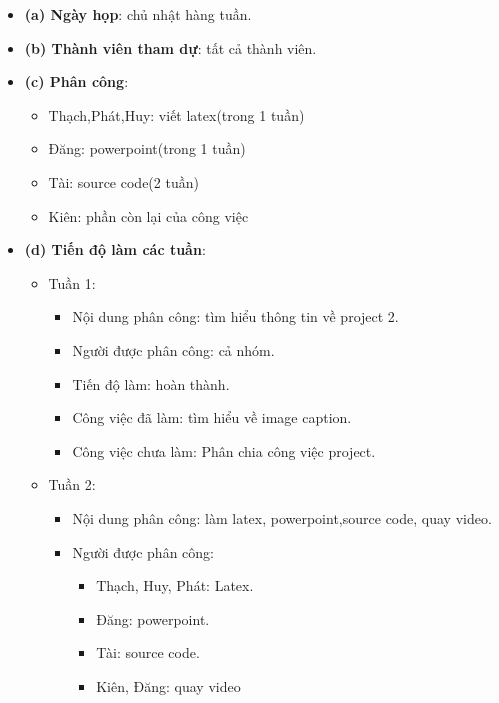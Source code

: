 \documentclass{article}
\begin{document}
\begin{itemize}
    \item \textbf{(a) Ngày họp}: chủ nhật hàng tuần.
    \item \textbf{(b) Thành viên tham dự}: tất cả thành viên.
    \item \textbf{(c) Phân công}:
        \begin{itemize}
            \item Thạch,Phát,Huy: viết latex(trong 1 tuần)
            \item Đăng: powerpoint(trong 1 tuần)
            \item Tài: source code(2 tuần)
            \item Kiên: phần còn lại của công việc
        \end{itemize}
    \item \textbf{(d) Tiến độ làm các tuần}:
        \begin{itemize}
            \item Tuần 1:
                \begin{itemize}
                    \item Nội dung phân công: tìm hiểu thông tin về project 2.
                    \item Người được phân công: cả nhóm.
                    \item Tiến độ làm: hoàn thành.
                    \item Công việc đã làm: tìm hiểu về image caption.
                    \item Công việc chưa làm: Phân chia công việc project.
                \end{itemize}
            \item Tuần 2:
                \begin{itemize}
                    \item Nội dung phân công: làm latex, powerpoint,source code, quay video.
                    \item Người được phân công:
                        \begin{itemize}
                            \item Thạch, Huy, Phát: Latex.
                            \item Đăng: powerpoint.
                            \item Tài: source code.
                            \item Kiên, Đăng: quay video
                        \end{itemize}

\end{itemize}
\end{itemize}
\end{itemize}
\end{document}
